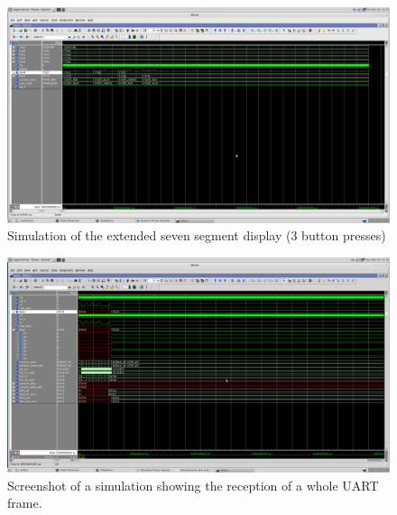 \documentclass[11pt,a4paper,titlepage,oneside]{article}
\begin{document}
\begin{figure}[h!]
	\centering
	\includegraphics[width=1.0\linewidth]{task5 - decimal.png}
	\caption{Simulation of the extended seven segment display (3 button presses)}
\end{figure}

\begin{qa}
\end{qa}

\begin{figure}[ht!]
	\centering
	\includegraphics[width=1.0\linewidth]{task6 - Simulation receiver.png}
	\caption{Screenshot of a simulation showing the reception of a whole UART frame.}
\end{figure}
\end{document}

